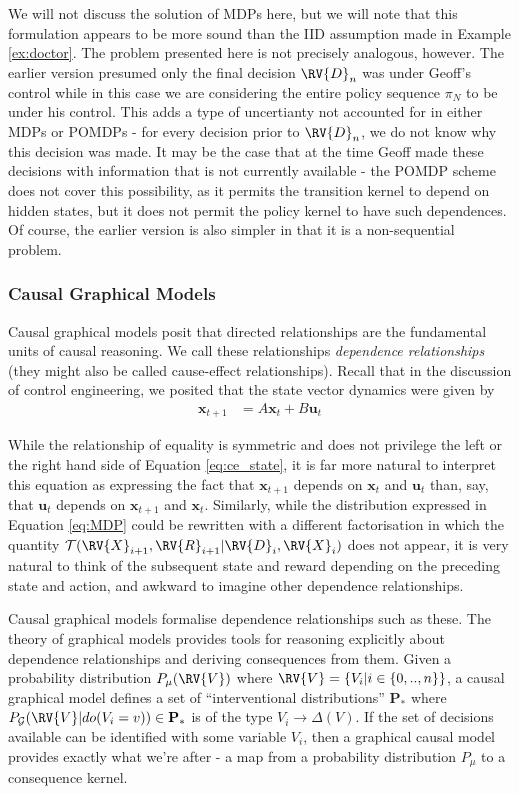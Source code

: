 We will not discuss the solution of MDPs here, but we will note that this formulation appears to be more sound than the IID assumption made in Example \ref{ex:doctor}. The problem presented here is not precisely analogous, however. The earlier version presumed only the final decision $\RV{D}_n$ was under Geoff's control while in this case we are considering the entire policy sequence $\pi_N$ to be under his control. This adds a type of uncertianty not accounted for in either MDPs or POMDPs - for every decision prior to $\RV{D}_n$, we do not know why this decision was made. It may be the case that at the time Geoff made these decisions with information that is not currently available - the POMDP scheme does not cover this possibility, as it permits the transition kernel to depend on hidden states, but it does not permit the policy kernel to have such dependences. Of course, the earlier version is also simpler in that it is a non-sequential problem.

\subsubsection{Causal Graphical Models}

Causal graphical models posit that directed relationships are the fundamental units of causal reasoning. We call these relationships \emph{dependence relationships} (they might also be called cause-effect relationships). Recall that in the discussion of control engineering, we posited that the state vector dynamics were given by
\begin{align}
        \mathbf{x}_{t+1} &= A\mathbf{x}_t + B\mathbf{u}_t \label{eq:ce_state}
\end{align}

While the relationship of equality is symmetric and does not privilege the left or the right hand side of Equation \ref{eq:ce_state}, it is far more natural to interpret this equation as expressing the fact that $\mathbf{x}_{t+1}$ depends on $\mathbf{x}_t$ and $\mathbf{u}_t$ than, say, that $\mathbf{u}_t$ depends on $\mathbf{x}_{t+1}$ and $\mathbf{x}_t$. Similarly, while the distribution expressed in Equation \ref{eq:MDP} could be rewritten with a different factorisation in which the quantity $\mathcal{T}(\RV{X}_{i+1},\RV{R}_{i+1}|\RV{D}_i,\RV{X}_i)$ does not appear, it is very natural to think of the subsequent state and reward depending on the preceding state and action, and awkward to imagine other dependence relationships.

Causal graphical models formalise dependence relationships such as these. The theory of graphical models provides tools for reasoning explicitly about dependence relationships and deriving consequences from them. Given a probability distribution $P_\mu(\RV{V})$ where $\RV{V}=\{V_i|i\in \{0,..,n\}\}$, a causal graphical model defines a set of ``interventional distributions'' $\mathbf{P}_*$ where $P_{\mathcal{G}}(\RV{V}|do(V_i=v))\in \textbf{P}_*$ is of the type $V_i\to \Delta(V)$. If the set of decisions available can be identified with some variable $V_i$, then a graphical causal model provides exactly what we're after - a map from a probability distribution $P_\mu$ to a consequence kernel.

